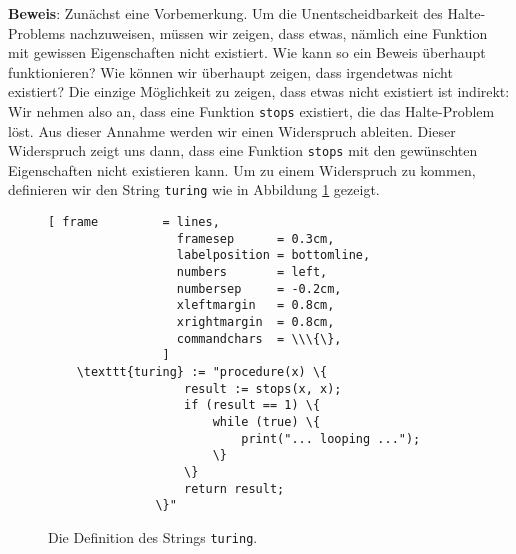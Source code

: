 \noindent
\textbf{Beweis}:  Zun\"{a}chst eine Vorbemerkung.  Um die Unentscheidbarkeit des
Halte-Problems nachzuweisen, m\"{u}ssen wir zeigen, dass etwas, n\"{a}mlich eine Funktion mit
gewissen Eigenschaften nicht existiert.  Wie kann so ein Beweis \"{u}berhaupt funktionieren?
Wie k\"{o}nnen wir \"{u}berhaupt zeigen, dass irgendetwas nicht existiert?
Die einzige M\"{o}glichkeit zu zeigen, dass etwas nicht existiert ist indirekt:
Wir nehmen also an, dass eine Funktion \texttt{stops} existiert, die das Halte-Problem l\"{o}st.
Aus dieser Annahme werden wir einen Widerspruch ableiten.  Dieser Widerspruch zeigt
uns dann, dass eine Funktion \texttt{stops} mit den gew\"{u}nschten Eigenschaften nicht
existieren kann.
Um zu einem Widerspruch zu kommen, definieren wir den String \texttt{turing} wie in Abbildung
\ref{fig:turing-string} gezeigt.

\begin{figure}[!h]
  \centering
\begin{Verbatim}[ frame         = lines, 
                  framesep      = 0.3cm, 
                  labelposition = bottomline,
                  numbers       = left,
                  numbersep     = -0.2cm,
                  xleftmargin   = 0.8cm,
                  xrightmargin  = 0.8cm,
                  commandchars  = \\\{\},
                ]
    \texttt{turing} := "procedure(x) \{
                   result := stops(x, x);
                   if (result == 1) \{
                       while (true) \{
                           print("... looping ...");
                       \}
                   \}
                   return result;
               \}"
\end{Verbatim}
  \vspace*{-0.3cm}
  \caption{Die Definition des Strings \texttt{turing}.}
  \label{fig:turing-string}
\end{figure}

